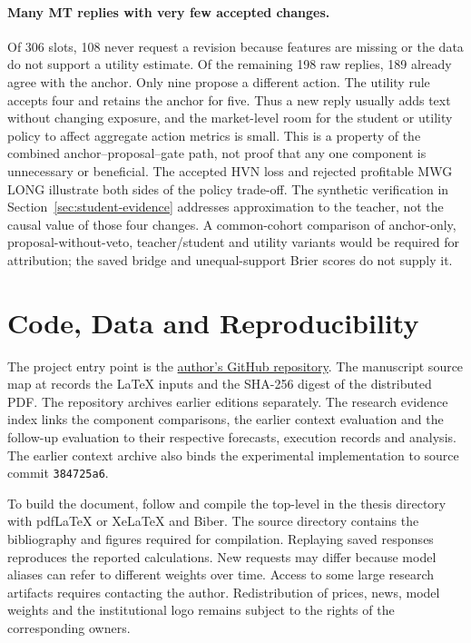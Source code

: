 \paragraph{Many MT replies with very few accepted changes.}
Of 306 slots, 108 never request a revision because features are missing or the data do not support a utility estimate. Of the remaining 198 raw replies, 189 already
agree with the anchor. Only nine propose a different action. The utility
rule accepts four and retains the anchor for five. Thus a new reply usually
adds text without changing exposure, and the market-level room for the
student or utility policy to affect aggregate action metrics is small.
This is a property of the combined anchor--proposal--gate path, not proof
that any one component is unnecessary or beneficial. The accepted HVN
loss and rejected profitable MWG LONG illustrate both sides of the
policy trade-off. The synthetic verification in
Section~\ref{sec:student-evidence} addresses approximation to the teacher,
not the causal value of those four changes. A common-cohort comparison
of anchor-only, proposal-without-veto, teacher/student and utility variants
would be required for attribution; the saved bridge and unequal-support
Brier scores do not supply it.

\section{Code, Data and Reproducibility}\label{sec:reproducibility}
The project entry point is the
\href{https://github.com/DungPhanHoangg05/A-Multi-Agent-Large-Language-Model-Approach-to-Price-Driven-Stock-Trading-in-the-Vietnamese-Stock-Ma}{author's GitHub repository}.
The manuscript source map at 
records the LaTeX inputs and the SHA-256 digest of the distributed PDF.
The repository archives earlier editions separately. The research
evidence index links the component comparisons, the earlier context
evaluation and the follow-up evaluation to their respective forecasts,
execution records and analysis. The earlier context archive also binds
the experimental implementation to source commit \texttt{384725a6}.

To build the document, follow  and compile the
top-level  in the thesis directory with pdfLaTeX or
XeLaTeX and Biber. The source directory contains the bibliography and
figures required for compilation. Replaying saved responses reproduces
the reported calculations. New requests may differ because model aliases
can refer to different weights over time. Access to some large
research artifacts requires contacting the author. Redistribution of
prices, news, model weights and the institutional logo remains subject
to the rights of the corresponding owners.

